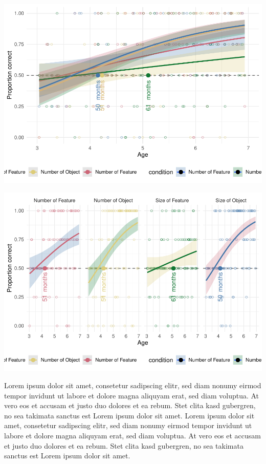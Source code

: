 \documentclass[
  man]{apa6}
\begin{document}
\includegraphics{symlit_rep_manuscript_files/figure-latex/S3_bayes_plot-1.pdf}

\includegraphics{symlit_rep_manuscript_files/figure-latex/S3_mixbayes_plot-1.pdf}

Lorem ipsum dolor sit amet, consetetur sadipscing elitr, sed diam nonumy eirmod tempor invidunt ut labore et dolore magna aliquyam erat, sed diam voluptua. At vero eos et accusam et justo duo dolores et ea rebum. Stet clita kasd gubergren, no sea takimata sanctus est Lorem ipsum dolor sit amet. Lorem ipsum dolor sit amet, consetetur sadipscing elitr, sed diam nonumy eirmod tempor invidunt ut labore et dolore magna aliquyam erat, sed diam voluptua. At vero eos et accusam et justo duo dolores et ea rebum. Stet clita kasd gubergren, no sea takimata sanctus est Lorem ipsum dolor sit amet.
\end{document}
